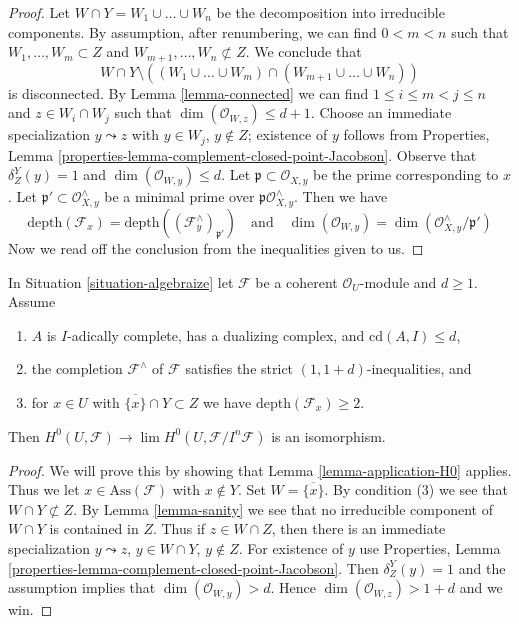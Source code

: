 \begin{proof}
Let $W \cap Y = W_1 \cup \ldots \cup W_n$ be the decomposition into
irreducible components. By assumption, after renumbering, we can find
$0 < m < n$ such that $W_1, \ldots, W_m  \subset Z$ and
$W_{m + 1}, \ldots, W_n \not \subset Z$. We conclude that
$$
W \cap Y \setminus
\left((W_1 \cup \ldots \cup W_m) \cap (W_{m + 1} \cup \ldots \cup W_n)\right)
$$
is disconnected. By Lemma \ref{lemma-connected} we can find
$1 \leq i \leq m < j \leq n$ and
$z \in W_i \cap W_j$ such that $\dim(\mathcal{O}_{W, z}) \leq d + 1$.
Choose an immediate specialization $y \leadsto z$ with
$y \in W_j$, $y \not \in Z$; existence of $y$ follows from
Properties, Lemma \ref{properties-lemma-complement-closed-point-Jacobson}.
Observe that $\delta^Y_Z(y) = 1$ and $\dim(\mathcal{O}_{W, y}) \leq d$.
Let $\mathfrak p \subset \mathcal{O}_{X, y}$ be the prime corresponding to $x$.
Let $\mathfrak p' \subset \mathcal{O}_{X, y}^\wedge$ be a minimal prime
over $\mathfrak p\mathcal{O}_{X, y}^\wedge$. Then we have
$$
\text{depth}(\mathcal{F}_x) =
\text{depth}((\mathcal{F}^\wedge_y)_{\mathfrak p'})
\quad\text{and}\quad
\dim(\mathcal{O}_{W, y}) = \dim(\mathcal{O}_{X, y}^\wedge/\mathfrak p')
$$
Now we read off the conclusion from the inequalities given to us.
\end{proof}

\begin{lemma}
\label{lemma-recover}
In Situation \ref{situation-algebraize} let $\mathcal{F}$ be a
coherent $\mathcal{O}_U$-module and $d \geq 1$. Assume
\begin{enumerate}
\item $A$ is $I$-adically complete, has a dualizing complex, and
$\text{cd}(A, I) \leq d$,
\item the completion $\mathcal{F}^\wedge$ of $\mathcal{F}$
satisfies the strict $(1, 1+ d)$-inequalities, and
\item for $x \in U$ with $\overline{\{x\}} \cap Y \subset Z$
we have $\text{depth}(\mathcal{F}_x) \geq 2$.
\end{enumerate}
Then $H^0(U, \mathcal{F}) \to \lim H^0(U, \mathcal{F}/I^n\mathcal{F})$
is an isomorphism.
\end{lemma}

\begin{proof}
We will prove this by showing that Lemma \ref{lemma-application-H0} applies.
Thus we let $x \in \text{Ass}(\mathcal{F})$ with $x \not \in Y$.
Set $W = \overline{\{x\}}$.
By condition (3) we see that $W \cap Y \not \subset Z$.
By Lemma \ref{lemma-sanity} we see that no irreducible
component of $W \cap Y$ is contained in $Z$.
Thus if $z \in W \cap Z$, then there is an immediate
specialization $y \leadsto z$, $y \in W \cap Y$, $y \not \in Z$.
For existence of $y$ use
Properties, Lemma \ref{properties-lemma-complement-closed-point-Jacobson}.
Then $\delta^Y_Z(y) = 1$ and the assumption
implies that $\dim(\mathcal{O}_{W, y}) > d$.
Hence $\dim(\mathcal{O}_{W, z}) > 1 + d$ and we win.
\end{proof}

